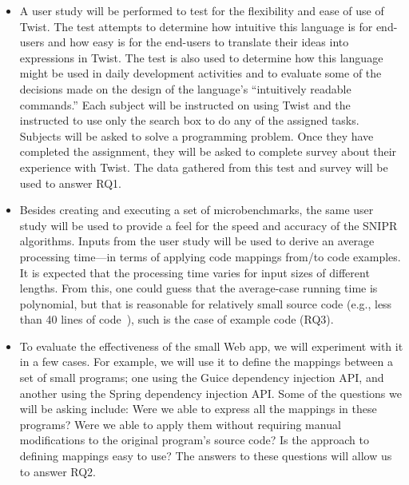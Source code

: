 \documentclass[conference]{IEEEtran}
\begin{document}
\begin{itemize}  
\item A user study will be performed to test for the flexibility and ease of use of Twist. The test attempts to determine how intuitive this language is for end-users and how easy is for the end-users to translate their ideas into expressions in Twist. The test is also used to determine how this language might be used in daily development activities and to evaluate some of the decisions made on the design of the language's ``intuitively readable commands.'' Each subject will be instructed on using Twist and the instructed to use only the search box to do any of the assigned tasks. Subjects will be asked to solve a programming problem. Once they have completed the assignment, they will be asked to complete survey about their experience with Twist. The data gathered from this test and survey will be used to answer RQ1.
\item Besides creating and executing a set of microbenchmarks, the same user study will be used to provide a feel for the speed and accuracy of the  \uppercase{SnipR} algorithms. Inputs from the user study will be used to derive an average processing time---in terms of applying code mappings from/to code examples. It is expected that the processing time varies for input sizes of different lengths. From this, one could guess that the average-case running time is polynomial, but that is reasonable for relatively small source code (e.g., less than 40 lines of code~\cite{Brandt:2009ew}), such is the case of example code (RQ3).
\item To evaluate the effectiveness of the small Web app, we will experiment with it in a few cases. For example, we will use it to define the mappings between a set of small programs; one using the Guice dependency injection API, and another using the Spring dependency injection API. Some of the questions we will be asking include: Were we able to express all the mappings in these programs? Were we able to apply them without requiring manual modifications to the original program's source code? Is the approach to defining mappings easy to use? The answers to these questions will allow us to answer RQ2.

\end{itemize}
\end{document}

